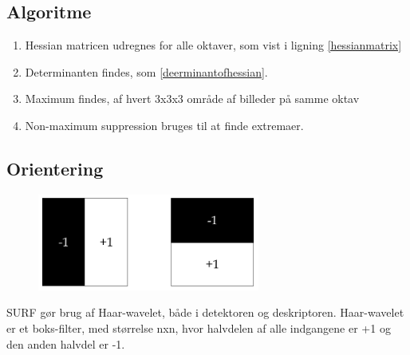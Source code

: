 \subsection*{Algoritme}
\begin{enumerate}
\item Hessian matricen udregnes for alle oktaver, som vist i ligning \eqref{hessianmatrix}
\item Determinanten findes, som \eqref{deerminantofhessian}.
\item Maximum findes, af hvert 3x3x3 område af billeder på samme oktav
\item Non-maximum suppression bruges til at finde extremaer.
\end{enumerate}





\subsection*{Orientering}


\begin{figure}[H]
    \centering
    \includegraphics[width=0.65\textwidth]{fig/haarwavelet.png}
     \vspace{-1em}
    \begin{center}    
       \caption{\textcolor{gray}{\footnotesize \textit{ }}}
    \label{fig:haarwavelet}
     \end{center}
     \vspace{-2.5em}
  \end{figure} \noindent

SURF gør brug af Haar-wavelet, både i detektoren og deskriptoren. Haar-wavelet er et boks-filter, med størrelse nxn, hvor halvdelen af alle indgangene er +1 og den anden halvdel er -1.


